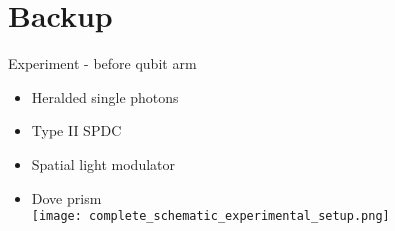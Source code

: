 
\appendix

\section{Backup}

\begin{frame}[t]{Experiment - before qubit arm}
  \begin{itemize}
    \item Heralded single photons
    \item Type II SPDC
    \item Spatial light modulator
    \item Dove prism\\
    \texttt{[image: complete\_schematic\_experimental\_setup.png]}
  \end{itemize}
\end{frame}

